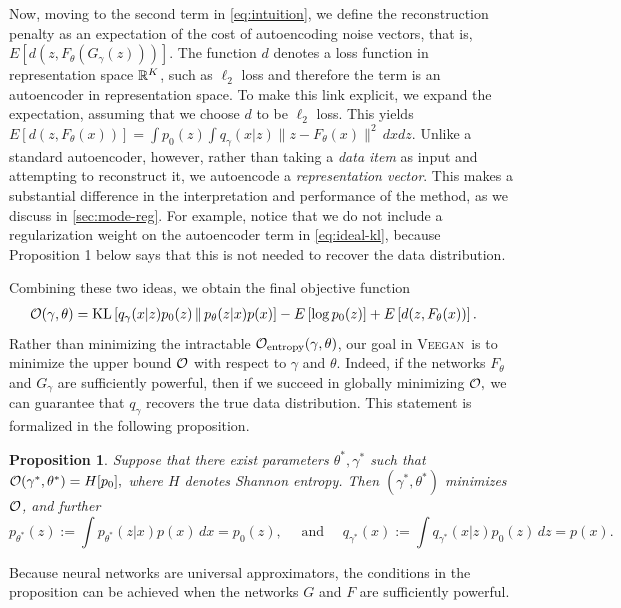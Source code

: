 \documentclass{article}
\newtheorem{proposition}{Proposition}
\newcommand{\KL}[2]{\mbox{KL}\left[ #1 \,\|\, #2 \right]}
\newcommand{\Exp}[1]{{E}\left[ #1 \right]}
\newcommand{\acronym}{\textsc{Veegan}\xspace}
\begin{document}
Now, moving to the second term in \eqref{eq:intuition},
we define the reconstruction penalty as an expectation of the cost of autoencoding noise vectors, that is,
$\Exp{d(z, F_\theta(G_\gamma(z)))}.$
The function $d$ denotes
a loss function in representation space $\mathbb{R}^K$, such as $\ell_2$ loss and therefore the term is an autoencoder in representation space. To make this link
explicit, we expand the expectation, assuming
that we choose $d$ to be $\ell_2$ loss. This yields
$\Exp{d(z, F_\theta(x))} =  \int p_0(z) \int q_\gamma(x|z) \|z - F_\theta(x)\|^2 \,dx dz.$ Unlike a standard autoencoder, however, rather than taking a \emph{data item} as input and attempting to reconstruct it, we  autoencode a \emph{representation vector}. 
This makes a substantial difference in the interpretation and performance of the method, as we discuss in \autoref{sec:mode-reg}. For example, notice that we do not
include a regularization weight on
the autoencoder term in \eqref{eq:ideal-kl}, because Proposition 1 below says that this is not needed to recover
the data distribution.


Combining these two ideas, we obtain the final objective function
\begin{align}
\calO(\gamma, \theta) & = \KL{q_\gamma(x|z) p_0(z)}{p_\theta(z|x)p(x)}
 - \Exp{\log p_0(z)}
+ \Exp{d(z, F_\theta(x))}. \label{eq:ideal-kl}
\end{align}
Rather than minimizing the intractable $\mathcal{O}_{\mathrm{entropy}}(\gamma,\theta)$, our goal in \acronym\ is to  minimize the upper bound $\mathcal{O}$  with respect to $\gamma$
and $\theta$.
Indeed, if the networks
$F_\theta$ and $G_\gamma$ are sufficiently powerful, then if we succeed
in globally minimizing $\mathcal{O},$  we can guarantee that $q_\gamma$ recovers
the true data distribution. This statement is formalized in the following proposition.

\begin{proposition}
Suppose that there exist parameters $\theta^*, \gamma^*$ such that 
$\mathcal{O}(\gamma^*, \theta^*) = H[p_0],$ where $H$ denotes Shannon entropy.
Then $(\gamma^*, \theta^*)$ minimizes $\mathcal{O}$, and further 
\begin{equation*}
 p_{\theta^*}(z) := \int p_{\theta^*}(z|x) p(x) \,dx = p_0(z), \quad \mbox{ and } \quad
q_{\gamma^*}(x) := \int q_{\gamma^*}(x|z) p_0(z) \,dz = p(x).
\end{equation*}
\end{proposition}
Because neural networks are universal approximators,
the conditions in the proposition can be achieved when the networks $G$ and $F$ are sufficiently powerful.
\end{document}
